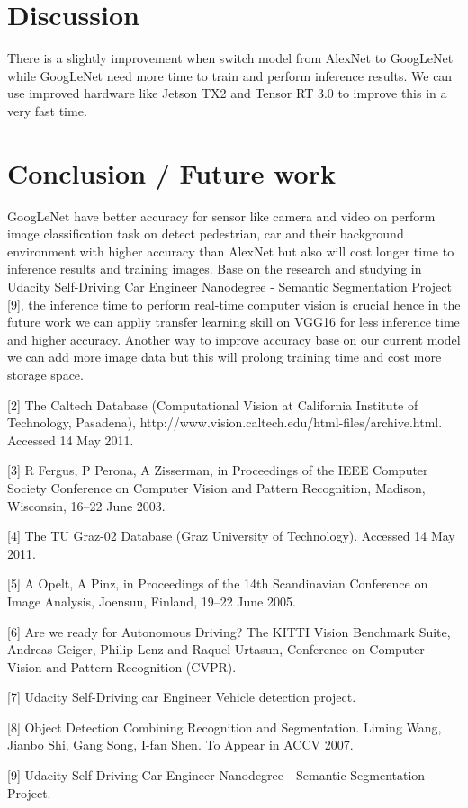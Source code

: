 \documentclass[10pt,journal,compsoc]{IEEEtran}
\begin{document}
\section{Discussion}
There is a slightly improvement when switch model from AlexNet to GoogLeNet while GoogLeNet need more time to train and perform inference results. We can use improved hardware like Jetson TX2 and Tensor RT 3.0 to improve this in a very fast time.

\section{Conclusion / Future work}
GoogLeNet have better accuracy for sensor like camera and video on perform image classification task on detect pedestrian, car and their background environment with higher accuracy than AlexNet but also will cost longer time to inference results and training images. Base on the research and studying in Udacity Self-Driving Car Engineer Nanodegree - Semantic Segmentation Project [9], the inference time to perform real-time computer vision is crucial hence in the future work we can appliy transfer learning skill on VGG16 for less inference time and higher accuracy. Another way to improve accuracy base on our current model we can add more image data but this will prolong training time and cost more storage space.



[2] The Caltech Database (Computational Vision at California Institute of Technology, Pasadena), http://www.vision.caltech.edu/html-files/archive.html. Accessed 14 May 2011.

[3] R Fergus, P Perona, A Zisserman, in Proceedings of the IEEE Computer Society Conference on Computer Vision and Pattern Recognition, Madison, Wisconsin, 16–22 June 2003.

[4] The TU Graz-02 Database (Graz University of Technology). Accessed 14 May 2011. 

[5] A Opelt, A Pinz, in Proceedings of the 14th Scandinavian Conference on Image Analysis, Joensuu, Finland, 19–22 June 2005.

[6] Are we ready for Autonomous Driving? The KITTI Vision Benchmark Suite, Andreas Geiger, Philip Lenz and Raquel Urtasun, Conference on Computer Vision and Pattern	Recognition (CVPR).

[7] Udacity Self-Driving car Engineer Vehicle detection project.

[8] Object Detection Combining Recognition and Segmentation. Liming Wang, Jianbo Shi, Gang Song, I-fan Shen. To Appear in ACCV 2007.

[9] Udacity Self-Driving Car Engineer Nanodegree - Semantic Segmentation Project.
\end{document}
